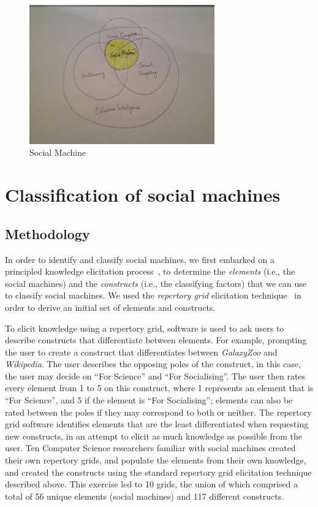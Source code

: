\documentclass{sig-alternate}
\begin{document}
\begin{figure}[htb]
\begin{center}
\includegraphics[width=8cm]{img/socialmachine.JPG}
\caption{Social Machine} \label{socialmachine}
\end{center}
\end{figure}

\section{Classification of social machines}

\subsection{Methodology}

In order to identify and classify social machines, we first embarked on a principled
knowledge elicitation process~\cite{knowledgeelicitation}, to determine the {\it elements}
(i.e., the social machines) and the {\it constructs} (i.e., the classifying factors) that
we can use to classify social machines. We used the {\it repertory grid} elicitation
technique~\cite{kelly} in order to derive an initial set of elements and constructs.

To elicit knowledge using a repertory grid, software is used to ask users to describe constructs
that differentiate between elements. For example, prompting the user to create a construct that
differentiates between {\it GalaxyZoo} and {\it Wikipedia}. The user describes the opposing poles of 
the construct, in this case, the user may decide on ``For Science'' and ``For Socialising''. The
user then rates every element from 1 to 5 on this construct, where 1 represents an element that is
``For Science'', and 5 if the element is ``For Socialising''; elements can also be rated between
the poles if they may correspond to both or neither. The repertory grid software identifies
elements that are the least differentiated when requesting new constructs, in an attempt to
elicit as much knowledge as possible from the user. Ten Computer Science researchers familiar with social machines created their own
repertory grids, and populate the elements from their own knowledge, and created the
constructs using the standard repertory grid elicitation technique described above. This exercise led
to 10 grids, the union of which comprised a total of 56 unique elements (social machines)
and 117 different constructs.
\end{document}
